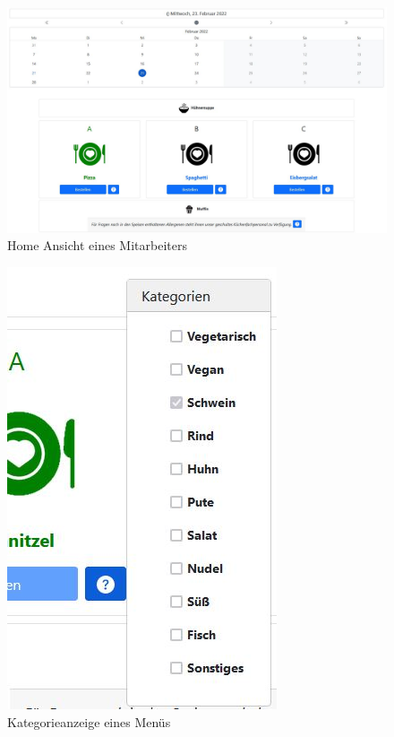 \begin{figure}[htp]
    \centering
    \includegraphics[scale=0.35]{pics/mitarbeiter-home.JPG}
    \caption{Home Ansicht eines Mitarbeiters}
    \label{fig:impl:HomeMitarbeiter}
\end{figure}

\begin{figure}[htp]
    \centering
    \includegraphics[scale=0.5]{pics/kategorien_mitarbeiter.JPG}
    \caption{Kategorieanzeige eines Menüs}
    \label{fig:impl:CategoriesForMenue}
\end{figure}

\pagebreak

